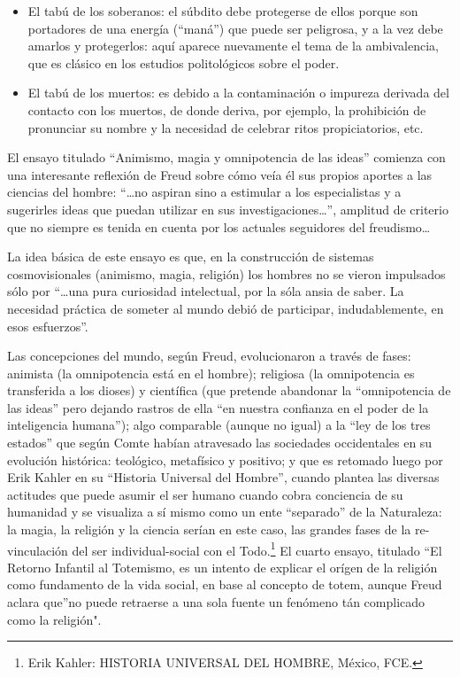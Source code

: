 \documentclass[
]{book}
\begin{document}
\begin{itemize}
\item
  El tabú de los soberanos: el súbdito debe protegerse de ellos porque son portadores de una energía (``maná'') que puede ser peligrosa, y a la vez debe amarlos y protegerlos: aquí aparece nuevamente el tema de la ambivalencia, que es clásico en los estudios politológicos sobre el poder.
\item
  El tabú de los muertos: es debido a la contaminación o impureza derivada del contacto con los muertos, de donde deriva, por ejemplo, la prohibición de pronunciar su nombre y la necesidad de celebrar ritos propiciatorios, etc.
\end{itemize}

El ensayo titulado ``Animismo, magia y omnipotencia de las ideas'' comienza con una interesante reflexión de Freud sobre cómo veía él sus propios aportes a las ciencias del hombre: ``\ldots no aspiran sino a estimular a los especialistas y a sugerirles ideas que puedan utilizar en sus investigaciones\ldots{}'', amplitud de criterio que no siempre es tenida en cuenta por los actuales seguidores del freudismo\ldots{}

La idea básica de este ensayo es que, en la construcción de sistemas cosmovisionales (animismo, magia, religión) los hombres no se vieron impulsados sólo por ``\ldots una pura curiosidad intelectual, por la sóla ansia de saber. La necesidad práctica de someter al mundo debió de participar, indudablemente, en esos esfuerzos''.

Las concepciones del mundo, según Freud, evolucionaron a través de fases: animista (la omnipotencia está en el hombre); religiosa (la omnipotencia es transferida a los dioses) y científica (que pretende abandonar la ``omnipotencia de las ideas'' pero dejando rastros de ella ``en nuestra confianza en el poder de la inteligencia humana''); algo comparable (aunque no igual) a la ``ley de los tres estados'' que según Comte habían atravesado las sociedades occidentales en su evolución histórica: teológico, metafísico y positivo; y que es retomado luego por Erik Kahler en su ``Historia Universal del Hombre'', cuando plantea las diversas actitudes que puede asumir el ser humano cuando cobra conciencia de su humanidad y se visualiza a sí mismo como un ente ``separado'' de la Naturaleza: la magia, la religión y la ciencia serían en este caso, las grandes fases de la re-vinculación del ser individual-social con el Todo.\footnote{Erik Kahler: HISTORIA UNIVERSAL DEL HOMBRE, México, FCE.} El cuarto ensayo, titulado ``El Retorno Infantil al Totemismo, es un intento de explicar el orígen de la religión como fundamento de la vida social, en base al concepto de totem, aunque Freud aclara que''no puede retraerse a una sola fuente un fenómeno tán complicado como la religión".
\end{document}

